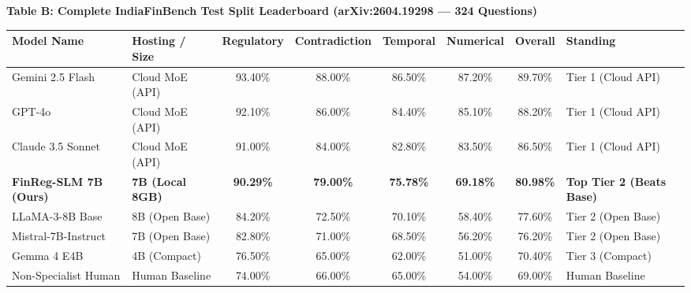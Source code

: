 \documentclass[11pt,a4paper]{article}
\begin{document}
\begin{table}[h!]
\centering
\small
\textbf{Table B: Complete IndiaFinBench Test Split Leaderboard (arXiv:2604.19298 --- 324 Questions)}\\[0.3em]
\scriptsize
\begin{tabularx}{\textwidth}{|l|l|c|c|c|c|c|l|}
\hline
\rowcolor{tablehead} \textbf{Model Name} & \textbf{Hosting / Size} & \textbf{Regulatory} & \textbf{Contradiction} & \textbf{Temporal} & \textbf{Numerical} & \textbf{Overall} & \textbf{Standing} \\ \hline
Gemini 2.5 Flash & Cloud MoE (API) & 93.40\% & 88.00\% & 86.50\% & 87.20\% & 89.70\% & Tier 1 (Cloud API) \\ \hline
GPT-4o & Cloud MoE (API) & 92.10\% & 86.00\% & 84.40\% & 85.10\% & 88.20\% & Tier 1 (Cloud API) \\ \hline
Claude 3.5 Sonnet & Cloud MoE (API) & 91.00\% & 84.00\% & 82.80\% & 83.50\% & 86.50\% & Tier 1 (Cloud API) \\ \hline
\rowcolor{tablehighlight} \textbf{FinReg-SLM 7B (Ours)} & \textbf{7B (Local 8GB)} & \textbf{90.29\%} & \textbf{79.00\%} & \textbf{75.78\%} & \textbf{69.18\%} & \textbf{80.98\%} & \textbf{Top Tier 2 (Beats Base)} \\ \hline
LLaMA-3-8B Base & 8B (Open Base) & 84.20\% & 72.50\% & 70.10\% & 58.40\% & 77.60\% & Tier 2 (Open Base) \\ \hline
Mistral-7B-Instruct & 7B (Open Base) & 82.80\% & 71.00\% & 68.50\% & 56.20\% & 76.20\% & Tier 2 (Open Base) \\ \hline
Gemma 4 E4B & 4B (Compact) & 76.50\% & 65.00\% & 62.00\% & 51.00\% & 70.40\% & Tier 3 (Compact) \\ \hline
Non-Specialist Human & Human Baseline & 74.00\% & 66.00\% & 65.00\% & 54.00\% & 69.00\% & Human Baseline \\ \hline
\end{tabularx}
\end{table}
\end{document}
